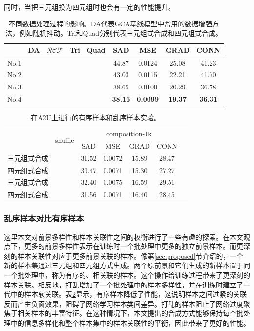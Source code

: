 \documentclass[supercite]{HustGraduPaper}
\begin{document}
	同时，当把三元组换为四元组时也会有一定的性能提升。


	\begin{table}[!t]
		\caption{不同数据处理过程的影响。DA代表GCA基线模型中常用的数据增强方法，例如随机抖动。Tri和Quad分别代表三元组式合成和四元组式合成。}
		\label{tab:component}
		\centering
		\begin{tabular}{@{}lcccccccc@{}}
		\toprule
		&DA  & $\mathcal{RCF}$ & Tri & Quad & SAD & MSE & GRAD & CONN \\
		\midrule
		No.1& &  &    &  & 44.87 & 0.0124 & 25.08 & 41.23 \\
		No.2&\Checkmark   &  &  &  & 43.03 & 0.0115 & 22.21 & 41.70 \\
		No.3&\Checkmark   & \Checkmark & \Checkmark &  & 38.65 & 0.0100 & 20.29 & 36.78 \\
		No.4&\Checkmark   & \Checkmark &  & \Checkmark & \textbf{38.16} &\textbf{ 0.0099} & \textbf{19.37} & \textbf{36.31}\\
		\bottomrule
		\end{tabular}
	\end{table}

	\begin{table}[htbp]\small
		\caption{在A2U上进行的有序样本和乱序样本实验。}
		\addtolength{\tabcolsep}{4pt}
		\renewcommand\arraystretch{1.1}
		\label{tab:distribution}
		\centering
		\begin{tabular}{@{}lcccccc@{}}
			\toprule
			  & \multirow{2}{*}{shuffle} &  \multicolumn{4}{c}{composition-1k}               \\
			  && SAD & MSE & GRAD & CONN \\
			\midrule
			三元组式合成& \multirow{2}{*}{\Checkmark}  
			&31.52 &0.0072 &15.89 &28.47 \\
			
			四元组式合成 &  &30.47 &0.0071 &15.30 &27.27 \\
			\hline
			三元组式合成& 
			&32.40 &0.0075 &16.59 &29.51 \\
			四元组式合成 &  &31.56 &0.0071 &16.40 &28.45\\
			\bottomrule
		\end{tabular}
	\end{table}
	\subsubsection{乱序样本对比有序样本}
	这里本文对前景多样性和样本关联性之间的权衡进行了一些有趣的探索。在本文观点下，更多的前景多样性表示在训练时一个批处理中更多的独立前景样本。而更深刻的样本关联性对应于更多前景关联的样本。像第\ref{sec:proposed}节介绍的，一个新的样本集通过三元组和四元组方式生成。两个原前景和它们生成的新样本置于同一个批处理中，称为有序的、相关联的样本。这个操作给训练过程带来了更深刻的样本关联。相反地，打乱增加了一个批处理中的样本多样性，并在训练时建立了一代中的样本软关联。表\ref{tab:distribution}显示，有序样本降低了性能，这说明样本之间过紧的关联反而产生负面效果，阻碍了网络学习样本类间差异。打乱的样本阻止了网络过度聚焦于相关样本的丰富特征。在这种情况下，本文提出的合成方式能够保持每个批处理中的信息多样化和整个样本集中的样本关联性的平衡，因此带来了更好的性能。
\end{document}
